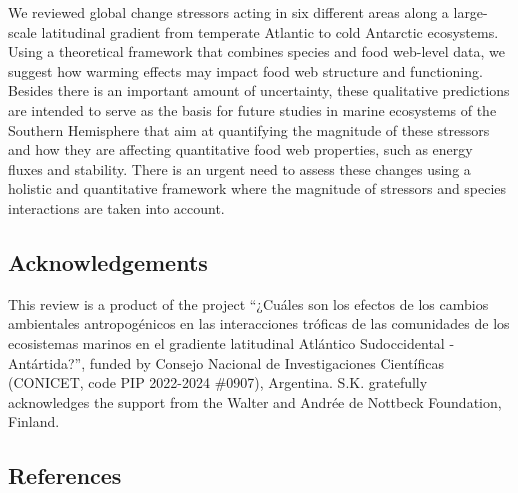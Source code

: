 \documentclass[
]{article}
\begin{document}
We reviewed global change stressors acting in six different areas along
a large-scale latitudinal gradient from temperate Atlantic to cold
Antarctic ecosystems. Using a theoretical framework that combines
species and food web-level data, we suggest how warming effects may
impact food web structure and functioning. Besides there is an important
amount of uncertainty, these qualitative predictions are intended to
serve as the basis for future studies in marine ecosystems of the
Southern Hemisphere that aim at quantifying the magnitude of these
stressors and how they are affecting quantitative food web properties,
such as energy fluxes and stability. There is an urgent need to assess
these changes using a holistic and quantitative framework where the
magnitude of stressors and species interactions are taken into account.

\subsection{Acknowledgements}\label{acknowledgements}

This review is a product of the project ``¿Cuáles son los efectos de los
cambios ambientales antropogénicos en las interacciones tróficas de las
comunidades de los ecosistemas marinos en el gradiente latitudinal
Atlántico Sudoccidental - Antártida?'', funded by Consejo Nacional de
Investigaciones Científicas (CONICET, code PIP 2022-2024 \#0907),
Argentina. S.K. gratefully acknowledges the support from the Walter and
Andrée de Nottbeck Foundation, Finland.

\subsection*{References}\label{references}
\end{document}
